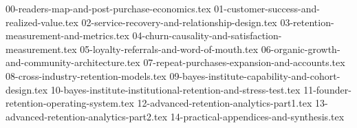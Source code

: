 {00-readers-map-and-post-purchase-economics.tex}
{01-customer-success-and-realized-value.tex}
{02-service-recovery-and-relationship-design.tex}
{03-retention-measurement-and-metrics.tex}
{04-churn-causality-and-satisfaction-measurement.tex}
{05-loyalty-referrals-and-word-of-mouth.tex}
{06-organic-growth-and-community-architecture.tex}
{07-repeat-purchases-expansion-and-accounts.tex}
{08-cross-industry-retention-models.tex}
{09-bayes-institute-capability-and-cohort-design.tex}
{10-bayes-institute-institutional-retention-and-stress-test.tex}
{11-founder-retention-operating-system.tex}
{12-advanced-retention-analytics-part1.tex}
{13-advanced-retention-analytics-part2.tex}
{14-practical-appendices-and-synthesis.tex}
